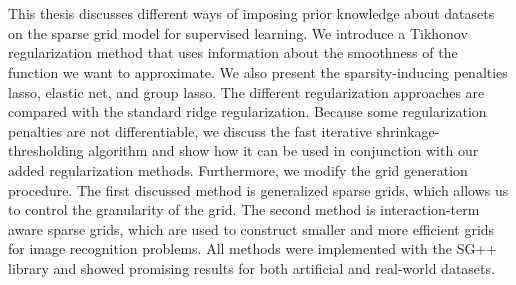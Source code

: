 \chapter{\abstractname}
This thesis discusses different ways of imposing prior knowledge about datasets on the sparse grid model for supervised learning.
We introduce a Tikhonov regularization method that uses information about the smoothness of the function we want to approximate.
We also present the sparsity-inducing penalties lasso, elastic net, and group lasso.
The different regularization approaches are compared with the standard ridge regularization.
Because some regularization penalties are not differentiable, we discuss the fast iterative shrinkage-thresholding algorithm and show how it can be used in conjunction with our added regularization methods.
Furthermore, we modify the grid generation procedure.
The first discussed method is generalized sparse grids, which allows us to control the granularity of the grid.
The second method is interaction-term aware sparse grids, which are used to construct smaller and more efficient grids for image recognition problems.
All methods were implemented with the SG++ library and showed promising results for both artificial and real-world datasets.

